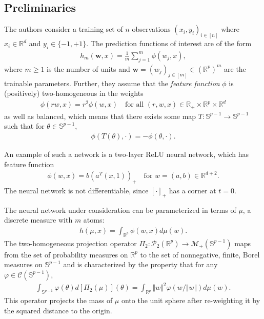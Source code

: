 \documentclass{article}
\begin{document}
\subsection{Preliminaries}
The authors consider a training set of $n$ observations $(x_i, y_i)_{i \in [n]}$ where $x_i \in \mathbb{R}^d$ and $y_i \in \{-1, +1\}$. The prediction functions of interest are of the form
\begin{align*}
    h_m(\boldsymbol{w}, x) = \frac{1}{m} \sum_{j=1}^m \phi(w_j, x),
\end{align*}
where $m \geq 1$ is the number of units and $\boldsymbol{w} = (w_j)_{j \in [m]} \in (\mathbb{R}^p)^m$ are the trainable parameters. Further, they assume that the \textit{feature function} $\phi$ is (positively) two-homogeneous in the weights
\begin{align*}
    \phi(rw, x) = r^2\phi(w, x) \quad \text{for all $(r, w, x) \in \mathbb{R}_+ \times \mathbb{R}^p \times \mathbb{R}^d$}
\end{align*}
as well as balanced, which means that there exists some map $T: \mathbb{S}^{p-1} \rightarrow \mathbb{S}^{p-1}$ such that for $\theta \in \mathbb{S}^{p-1}$,
\begin{align*}
    \phi(T(\theta), \cdot) = -\phi(\theta, \cdot).
\end{align*}

An example of such a network is a two-layer ReLU neural network, which has feature function
\begin{align*}
    \phi(w, x) = b(a^T(x, 1))_+ \quad \text{for $w = (a, b) \in \mathbb{R}^{d+2}$}.
\end{align*}
The neural network is not differentiable, since $[\cdot]_+$ has a corner at $t=0$.

The neural network under consideration can be parameterized in terms of $\mu$, a discrete measure with $m$ atoms:
\begin{align*}
    h(\mu, x) = \int_{\mathbb{R}^p} \phi(w, x) d\mu(w).
\end{align*}
The two-homogeneous projection operator $\Pi_2: \mathcal{P}_2(\mathbb{R}^p) \rightarrow \mathcal{M}_+(\mathbb{S}^{p-1})$ maps from the set of probability measures on $\mathbb{R}^p$ to the set of nonnegative, finite, Borel measures on $\mathbb{S}^{p-1}$ and is characterized by the property that for any $\varphi \in \mathcal{C}(\mathbb{S}^{p-1})$,
\begin{align*}
    \int_{\mathbb{S}^{p-1}} \varphi(\theta) d[\Pi_2(\mu)](\theta) = \int_{\mathbb{R}^p} \Vert w \Vert^2 \varphi(w/\Vert w \Vert) d \mu(w).
\end{align*}
This operator projects the mass of $\mu$ onto the unit sphere after re-weighting it by the squared distance to the origin.
\end{document}
